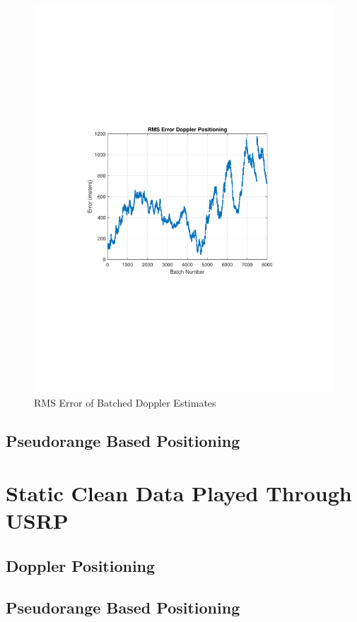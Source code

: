 \documentclass[12pt]{report}
\begin{document}
\begin{figure}[h!]
    \centering
    \includegraphics[trim=1.2in 3.3in 1.75in 3.3in,clip,width=5in]{Iridium RMSE plot Doppler Cleanest file.pdf}
    \caption{RMS Error of Batched Doppler Estimates}
    \label{fig:RMSErrorBatchDoppler}
\end{figure}


\subsection{Pseudorange Based Positioning}
\section{Static Clean Data Played Through USRP}
\subsection{Doppler Positioning}
\subsection{Pseudorange Based Positioning}
\end{document}
